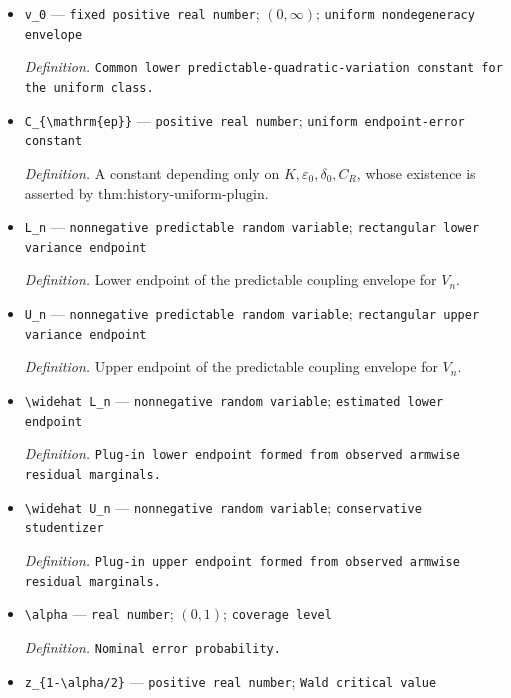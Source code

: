 \documentclass{article}
\begin{document}
\begin{itemize}
  \item \texttt{v\_\allowbreak{}0} --- \texttt{fixed positive real number}; \((0,\infty)\); \texttt{uniform nondegeneracy envelope}
  \par\smallskip\noindent\emph{Definition.} \texttt{Common lower predictable-\allowbreak{}quadratic-\allowbreak{}variation constant for the uniform class.}
  \item \texttt{C\_\allowbreak{}\{\textbackslash{}\allowbreak{}mathrm\{ep\}\allowbreak{}\}\allowbreak{}} --- \texttt{positive real number}; \texttt{uniform endpoint-\allowbreak{}error constant}
  \par\smallskip\noindent\emph{Definition.} A constant depending only on \(K,\varepsilon_0,\delta_0,C_R\), whose existence is asserted by \(\text{thm:history-uniform-plugin}\).
  \item \texttt{L\_\allowbreak{}n} --- \texttt{nonnegative predictable random variable}; \texttt{rectangular lower variance endpoint}
  \par\smallskip\noindent\emph{Definition.} Lower endpoint of the predictable coupling envelope for \(V_n\).
  \item \texttt{U\_\allowbreak{}n} --- \texttt{nonnegative predictable random variable}; \texttt{rectangular upper variance endpoint}
  \par\smallskip\noindent\emph{Definition.} Upper endpoint of the predictable coupling envelope for \(V_n\).
  \item \texttt{\textbackslash{}\allowbreak{}widehat L\_\allowbreak{}n} --- \texttt{nonnegative random variable}; \texttt{estimated lower endpoint}
  \par\smallskip\noindent\emph{Definition.} \texttt{Plug-\allowbreak{}in lower endpoint formed from observed armwise residual marginals.}
  \item \texttt{\textbackslash{}\allowbreak{}widehat U\_\allowbreak{}n} --- \texttt{nonnegative random variable}; \texttt{conservative studentizer}
  \par\smallskip\noindent\emph{Definition.} \texttt{Plug-\allowbreak{}in upper endpoint formed from observed armwise residual marginals.}
  \item \texttt{\textbackslash{}\allowbreak{}alpha} --- \texttt{real number}; \((0,1)\); \texttt{coverage level}
  \par\smallskip\noindent\emph{Definition.} \texttt{Nominal error probability.}
  \item \texttt{z\_\allowbreak{}\{1-\allowbreak{}\textbackslash{}\allowbreak{}alpha/\allowbreak{}2\}\allowbreak{}} --- \texttt{positive real number}; \texttt{Wald critical value}

\end{itemize}
\end{document}
